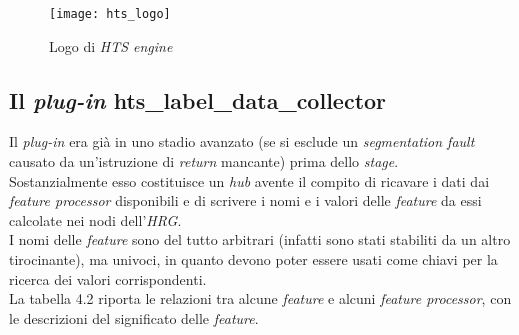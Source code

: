 \begin{figure}[!h] 
    		\centering 
    		\texttt{[image: hts\_logo]} 
   	 	\caption{Logo di \textit{HTS engine}}
\end{figure}


      \subsection{Il \textit{plug-in} hts\_label\_data\_collector}
		Il \textit{plug-in} era già in uno stadio avanzato (se si esclude un \textit{segmentation fault} causato
                da un'istruzione di \textit{return} mancante) prima dello \textit{stage}. \\
		Sostanzialmente esso costituisce un \textit{hub} avente il compito di ricavare i dati dai 
                \textit{feature processor} disponibili
		e di scrivere i nomi e i valori delle \textit{feature} da essi calcolate nei nodi dell'\textit{HRG}. \\
                I nomi delle \textit{feature} sono del tutto arbitrari (infatti sono stati stabiliti da un altro tirocinante),
		ma univoci, in quanto devono poter essere usati come chiavi per la ricerca dei valori corrispondenti. \\
                La tabella 4.2 riporta le relazioni tra alcune \textit{feature} e alcuni \textit{feature processor}, con le descrizioni
                del significato delle \textit{feature}.
                \newpage
